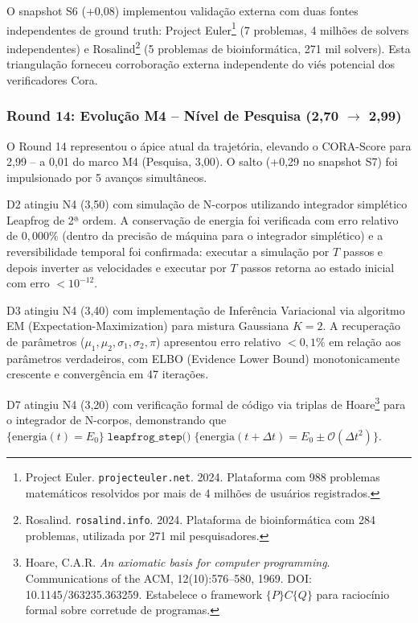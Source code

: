 O snapshot S6 (+0,08) implementou validação externa com duas fontes
independentes de ground truth: Project Euler\footnote{Project Euler.
\texttt{projecteuler.net}. 2024. Plataforma com 988 problemas matemáticos
resolvidos por mais de 4 milhões de usuários registrados.} (7 problemas,
4 milhões de solvers independentes) e
Rosalind\footnote{Rosalind. \texttt{rosalind.info}. 2024. Plataforma de
bioinformática com 284 problemas, utilizada por 271 mil pesquisadores.}
(5 problemas de bioinformática, 271 mil solvers). Esta triangulação
forneceu corroboração externa independente do viés potencial dos
verificadores Cora.

\subsubsection{Round 14: Evolução M4 -- Nível de Pesquisa (2,70 $\rightarrow$ 2,99)}

O Round 14 representou o ápice atual da trajetória, elevando o
CORA-Score para 2,99 -- a 0,01 do marco M4 (Pesquisa, 3,00). O salto
(+0,29 no snapshot S7) foi impulsionado por 5 avanços simultâneos.

D2 atingiu N4 (3,50) com simulação de N-corpos utilizando integrador
simplético Leapfrog de 2ª ordem. A conservação de energia foi verificada
com erro relativo de $0{,}000\%$ (dentro da precisão de máquina para o
integrador simplético) e a reversibilidade temporal foi confirmada:
executar a simulação por $T$ passos e depois inverter as velocidades e
executar por $T$ passos retorna ao estado inicial com erro $< 10^{-12}$.

D3 atingiu N4 (3,40) com implementação de Inferência Variacional via
algoritmo EM (Expectation-Maximization) para mistura Gaussiana $K=2$. A
recuperação de parâmetros ($\mu_1, \mu_2, \sigma_1, \sigma_2, \pi$)
apresentou erro relativo $< 0{,}1\%$ em relação aos parâmetros
verdadeiros, com ELBO (Evidence Lower Bound) monotonicamente crescente e
convergência em 47 iterações.

D7 atingiu N4 (3,20) com verificação formal de código via triplas de
Hoare\footnote{Hoare, C.A.R. \textit{An axiomatic basis for computer
programming}. Communications of the ACM, 12(10):576--580, 1969. DOI:
10.1145/363235.363259. Estabelece o framework $\{P\}C\{Q\}$ para
raciocínio formal sobre corretude de programas.} para o integrador de
N-corpos, demonstrando que $\{\text{energia}(t) = E_0\}\;
\texttt{leapfrog\_step()}\; \{\text{energia}(t+\Delta t) = E_0 \pm
\mathcal{O}(\Delta t^2)\}$.

